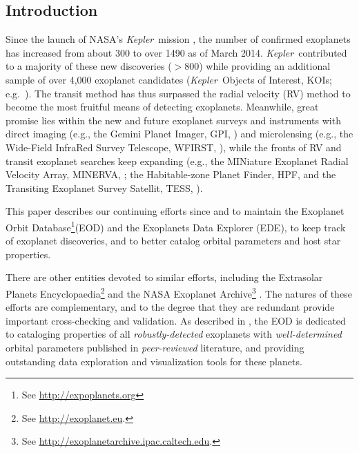 \documentclass[11pt,preprint]{aastex}
\def\kepler{\textit{Kepler}}
\begin{document}
\begin{CJK*}{UTF8}{gbsn}
\section{Introduction}\label{sec:intro}

Since the launch of NASA's \kepler\ mission \citep{Borucki2010}, the
number of confirmed exoplanets has increased from about 300 to over
1490 as of March 2014. \kepler\ contributed to a majority of these new discoveries ($> 800$) while providing an
additional sample of over 4,000 exoplanet candidates (\kepler\ Objects
of Interest, KOIs; e.g.~\citealt{Batalha2013}). The transit method has thus surpassed the radial velocity (RV) method to become the most fruitful
means of detecting exoplanets. Meanwhile, great promise lies within
the new and future exoplanet surveys and instruments with direct
imaging (e.g., the Gemini Planet Imager, GPI,
\citealt{Macintosh2014}) and microlensing (e.g., the Wide-Field
InfraRed Survey Telescope, WFIRST, \citealt{Green2012}), while the
fronts of RV and transit exoplanet searches keep expanding (e.g., the
MINiature Exoplanet Radial Velocity Array, MINERVA,
\citep{Wright2014}; the Habitable-zone Planet Finder, HPF, \cite{Mahadevan2012} and the
Transiting Exoplanet Survey Satellit, TESS, \citealt{Ricker2014}).

This paper describes our continuing efforts since \cite{Butler2006}
and \cite{Wright2011} to maintain the Exoplanet Orbit Database\footnote{See \url{http://expoplanets.org}}(EOD)
and the Exoplanets Data Explorer (EDE), to keep track of exoplanet
discoveries, and to better catalog orbital parameters and host star
properties. 

There are other entities devoted to similar efforts,
including the Extrasolar Planets Encyclopaedia\footnote{See
  \url{http://exoplanet.eu}.}  \citep{Schneider2011} and the NASA
Exoplanet Archive\footnote{See
  \url{http://exoplanetarchive.ipac.caltech.edu}.}
\citep{Akeson2013}.  The natures of these efforts are complementary, and to the
degree that they are redundant provide important cross-checking and
validation.  As described in \cite{Wright2011}, the EOD is
dedicated to cataloging properties of all \emph{robustly-detected} exoplanets with
\emph{well-determined} orbital parameters published in
\emph{peer-reviewed} literature, and providing outstanding data
exploration and visualization tools for these planets.


\end{CJK*}
\end{document}
